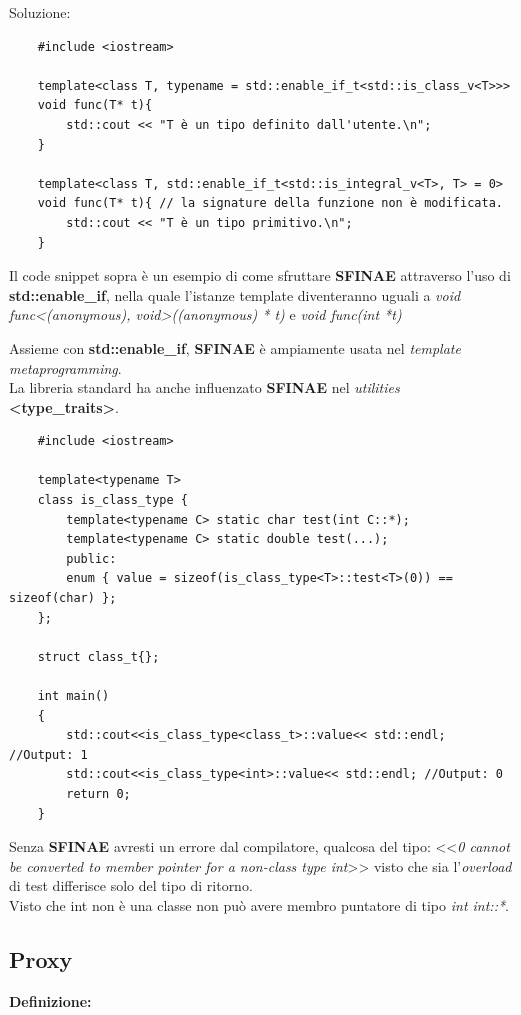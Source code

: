 \textsf{\small Soluzione: } \\

\begin{lstlisting}
	#include <iostream>
	
	template<class T, typename = std::enable_if_t<std::is_class_v<T>>>
	void func(T* t){
		std::cout << "T è un tipo definito dall'utente.\n";
	}
	
	template<class T, std::enable_if_t<std::is_integral_v<T>, T> = 0>
	void func(T* t){ // la signature della funzione non è modificata.
		std::cout << "T è un tipo primitivo.\n";
	}
\end{lstlisting}

\textsf{\small Il code snippet sopra è un esempio di come sfruttare \textbf{SFINAE} attraverso l'uso di \textbf{std::enable\_if}, nella quale l'istanze template diventeranno uguali a \emph{void func<(anonymous), void>((anonymous) * t)} e \emph{void func(int *t)}} \break

\textsf{\small Assieme con \textbf{std::enable\_if}, \textbf{SFINAE} è ampiamente usata nel \emph{template metaprogramming}.} \\

\textsf{\small La libreria standard ha anche influenzato \textbf{SFINAE} nel \emph{utilities} \textbf{<type\_traits>}.} \\

\begin{lstlisting}
	#include <iostream>
	
	template<typename T>
	class is_class_type {
		template<typename C> static char test(int C::*);    
		template<typename C> static double test(...);
		public:
		enum { value = sizeof(is_class_type<T>::test<T>(0)) == sizeof(char) };
	};
	
	struct class_t{};
	
	int main()
	{
		std::cout<<is_class_type<class_t>::value<< std::endl; //Output: 1
		std::cout<<is_class_type<int>::value<< std::endl; //Output: 0
		return 0;
	}
\end{lstlisting}

\textsf{\small Senza \textbf{SFINAE} avresti un errore dal compilatore, qualcosa del tipo: <<\emph{0 cannot be converted to member pointer for a non-class type int}>> visto che sia l'\emph{overload} di test differisce solo del tipo di ritorno.} \\
\textsf{\small Visto che int non è una classe non può avere membro puntatore di tipo \emph{int int::*}.} \\


\subsection{Proxy}

\textsf{\small \textbf{Definizione: } } \\

